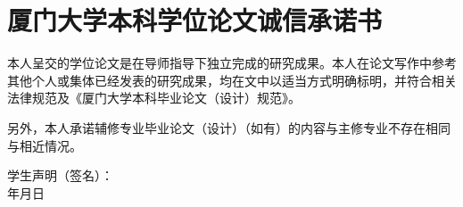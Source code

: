 \chapter*{厦门大学本科学位论文诚信承诺书}
\begin{doublespace}

{\sihao

	本人呈交的学位论文是在导师指导下独立完成的研究成果。本人在论文写作中参考其他个人或集体已经发表的研究成果，均在文中以适当方式明确标明，并符合相关法律规范及《厦门大学本科毕业论文（设计）规范》。


	另外，本人承诺辅修专业毕业论文（设计）（如有）的内容与主修专业不存在相同与相近情况。

	\vspace{20pt}

	\hfill 学生声明（签名）：\hspace*{4cm}\\
	\vspace{-10pt}
	\hfill 年\hspace{26pt}月\hspace{26pt}日\hspace*{2cm}
}
\end{doublespace}
\clearpage
